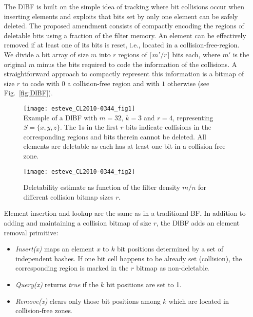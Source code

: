 \documentclass[conference]{IEEEtran}
\begin{document}
The DlBF is built on the simple idea of tracking where bit collisions occur when inserting elements and exploits that bits set by only one element can be safely deleted. The proposed amendment consists of compactly encoding the regions of deletable bits using a fraction of the filter memory. 
An element can be effectively removed if at least one of its bits is reset, i.e., located in a collision-free-region.
 We divide a bit array of size $m$  into $r$ regions of $\lceil m'/r \rceil$ bits each, where $m'$ is the original $m$ minus the bits required to code the information of the collisions. A straightforward approach to compactly represent this information is a bitmap of size $r$ to code with $0$ a collision-free region and with $1$ otherwise (see Fig.~\ref{fig:DlBF}). \begin{figure*}[t] \begin{minipage}[b]{0.6\linewidth}
           \texttt{[image: esteve\_CL2010-0344\_fig1]}\\
           \caption{Example of a DlBF with $m=32$, $k=3$ and $r=4$, representing $S=\{x, y, z\}$. The 1s in the first $r$ bits indicate collisions in the corresponding regions and bits therein cannot be deleted. All elements are deletable as each has at least one bit in a collision-free zone.}
           \label{fig:DlBF}
       \end{minipage}\hfill
       \begin{minipage}[b]{0.38\linewidth}
           \texttt{[image: esteve\_CL2010-0344\_fig2]}\\
           \caption{Deletability estimate as function of the filter density $m/n$ for different collision bitmap sizes $r$.}
           \label{fig:del-r}
       \end{minipage}\hfill
   \end{figure*}
Element insertion and lookup are the same as in a traditional BF. In addition to adding and maintaining a collision bitmap of size $r$, the DlBF adds an element removal primitive:
\begin{itemize}
\item \textit{Insert(x)} maps an element $x$ to $k$ bit positions determined by a set of independent hashes. If one bit cell happens to be already set (collision), the corresponding region is marked in the $r$ bitmap as non-deletable.
\item  \textit{Query(x)}  returns \textit{true} if the $k$ bit positions are set to 1. \item  \textit{Remove(x)} clears only those bit positions among $k$ which are located in collision-free zones. 
\end{itemize}
\end{document}
